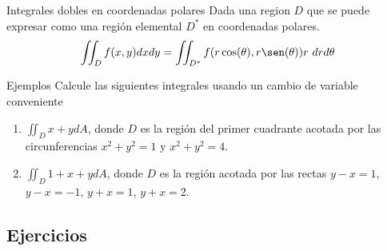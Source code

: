 \begin{frame}
\begin{block}{Integrales dobles en coordenadas polares}
  Dada una region $D$ que se puede expresar como una región elemental $D^*$ en coordenadas polares.
  $$\iint_D f(x,y) dxdy=\iint_{D^*} f(r\cos(\theta),r\sen(\theta))r\ drd\theta$$
\end{block}
\end{frame}

\begin{frame}{Ejemplos}
  Calcule las siguientes integrales usando un cambio de variable conveniente
  \begin{enumerate}[<+->]
    \item $\displaystyle\iint_{D} x+y dA$, donde $D$ es la región del primer cuadrante acotada por las circunferencias $x^2+y^2=1$ y $x^2+y^2=4$.
    \item $\displaystyle\iint_{D} 1+x+y dA$, donde $D$ es la región acotada por las rectas $y-x=1$, $y-x=-1$, $y+x=1$, $y+x=2$.
  \end{enumerate}
\end{frame}

\subsection{Ejercicios}
\begin{frame}
\subsectionpage
\end{frame}


